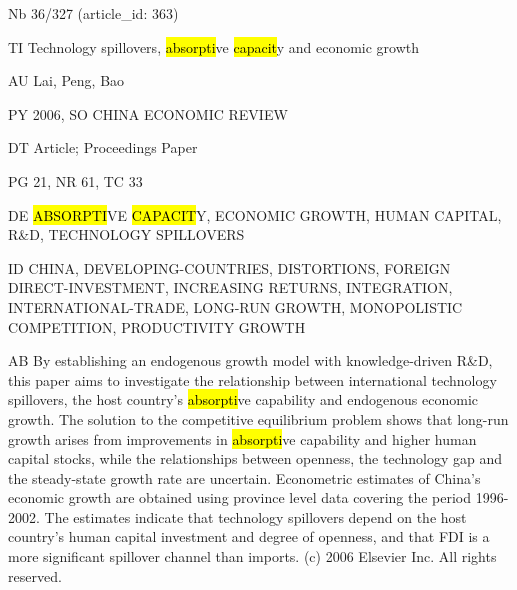 \documentclass[a4paper]{article}
\begin{document}
\vspace*{-2cm}
Nb \tabto{0cm}36/327 (article\_id: 363)\par
TI \tabto{0cm}Technology spillovers, \hl{absorpti}ve \hl{capacit}y and economic growth\par
AU \tabto{0cm}Lai, Peng, Bao\par
PY \tabto{0cm}2006, SO CHINA ECONOMIC REVIEW\par
DT \tabto{0cm}Article; Proceedings Paper\par
PG \tabto{0cm}21, NR 61, TC 33\par
DE \tabto{0cm}\hl{ABSORPTI}VE \hl{CAPACIT}Y, ECONOMIC GROWTH, HUMAN CAPITAL, R\&D, TECHNOLOGY SPILLOVERS\par
ID \tabto{0cm}CHINA, DEVELOPING-COUNTRIES, DISTORTIONS, FOREIGN DIRECT-INVESTMENT, INCREASING RETURNS, INTEGRATION, INTERNATIONAL-TRADE, LONG-RUN GROWTH, MONOPOLISTIC COMPETITION, PRODUCTIVITY GROWTH\par
AB \tabto{0cm}By establishing an endogenous growth model with knowledge-driven R\&D, this paper aims to investigate the relationship between international technology spillovers, the host country's \hl{absorpti}ve capability and endogenous economic growth. The solution to the competitive equilibrium problem shows that long-run growth arises from improvements in \hl{absorpti}ve capability and higher human capital stocks, while the relationships between openness, the technology gap and the steady-state growth rate are uncertain. Econometric estimates of China's economic growth are obtained using province level data covering the period 1996-2002. The estimates indicate that technology spillovers depend on the host country's human capital investment and degree of openness, and that FDI is a more significant spillover channel than imports. (c) 2006 Elsevier Inc. All rights reserved.\par
\clearpage
\end{document}
